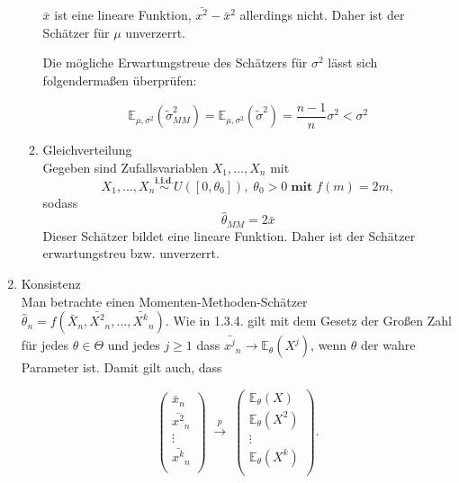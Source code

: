 \documentclass[10pt]{article}
\newcommand{\FZV}{X_1, \ldots, X_n} %
\newcommand{\EW}{\mathbb{E}} %
\newenvironment{BSP}[1][]
{\begin{Beispiel}[frametitle=#1]}{\end{Beispiel}}
\begin{document}
\begin{enumerate}
\begin{BSP}[Beispiel 1.3.3 (Erwartungstreue)]
\begin{enumerate}[label = (\roman*)]
			$\bar{x}$ ist eine lineare Funktion, $\bar{x^2}-\bar{x}^2$ allerdings nicht.  Daher ist der Schätzer für $\mu$ unverzerrt. 
			
			Die mögliche Erwartungstreue des Schätzers für $\sigma^2$ lässt sich folgendermaßen überprüfen:
			
			\begin{equation*}
				\EW_{\mu,\sigma^2} (\tilde{\sigma}^2_{MM}) = \EW_{\mu,\sigma^2} (\tilde{\sigma}^2) = \frac{n - 1 }{n} \sigma^2 < \sigma^2 
			\end{equation*}
			
			\item Gleichverteilung\\
			Gegeben sind Zufallsvariablen $\FZV$ mit
			\begin{equation*}
				\FZV \overset{\textbf{i.i.d.}}{\sim} U([0,\theta_0]), \; \theta_0 >0 \;\textbf{mit}\; f(m) = 2m,
			\end{equation*}
			sodass
			\begin{equation*}
				\hat{\theta}_{MM} = 2\bar{x}
			\end{equation*}
			Dieser Schätzer bildet eine lineare Funktion. Daher ist der Schätzer erwartungstreu bzw. unverzerrt. 
		\end{enumerate}	
	\end{BSP}


	
	\item Konsistenz \\
	Man betrachte einen Momenten-Methoden-Schätzer $\hat{\theta}_n = f(\bar{X}_n, \bar{X^2}_n, \ldots, \bar{X^k}_n)$. Wie in 1.3.4. gilt mit dem Gesetz der Großen Zahl für jedes $\theta \in \Theta$ und jedes $j \geq 1$ dass $\bar{x^j}_n \longrightarrow \EW_\theta (X^j)$, wenn $\theta$ der wahre Parameter ist. Damit gilt auch, dass
	
		\begin{equation*}
		\left(
		\begin{array}{c}
			\bar{x}_n\\
			\bar{x^2}_n\\
			\vdots\\
			\bar{x^k}_n\\
		\end{array}
		\right)\; \overset{p}\longrightarrow \;
		\left(
		\begin{array}{c}
			\EW_\theta(X)\\
			\EW_\theta(X^2)\\
			\vdots\\
			\EW_\theta(X^k) \\
		\end{array}
		\right).
	\end{equation*}


\end{enumerate}
\end{document}
